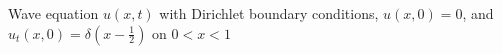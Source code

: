 \documentclass[preview]{standalone}
\begin{document}
\begin{center}
Wave equation $u(x,t)$ with Dirichlet boundary conditions, $u(x,0)=0$, and $u_t(x,0)=\delta(x-\frac{1}{2})$ on $0<x<1$
\end{center}
\end{document}
